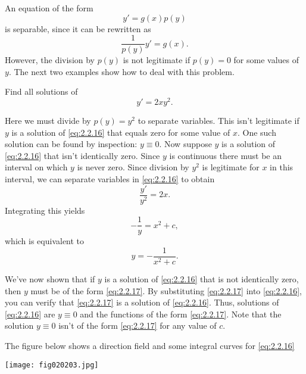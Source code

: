 \documentclass{ximera}
\begin{document}
An equation of the form
$$
y'=g(x)p(y)
$$
 is separable, since it can be rewritten as
$$
\frac{1}{p(y)}y'=g(x).
$$
 However, the division by  $p(y)$
is not legitimate  if $p(y)=0$ for some values of $y$.  The
next two examples show how to deal with this problem.
 
\begin{example}\label{example:2.2.4}
Find all solutions of
\begin{equation} \label{eq:2.2.16}
y'=2xy^2.
\end{equation}
 
\begin{explanation}
Here we must divide by $p(y)=y^2$ to separate variables.
This isn't  legitimate if $y$ is a solution of \eqref{eq:2.2.16} that
equals zero for some value of $x$. One such solution can be found by
inspection:  $y \equiv 0$. Now suppose   $y$ is a solution
of \eqref{eq:2.2.16} that isn't  identically zero. Since $y$ is continuous there must be an interval on which $y$ is never zero. Since division
by $y^2$ is legitimate for $x$ in this interval, we can separate
variables in \eqref{eq:2.2.16} to obtain
$$
\frac{y'}{y^2}=2x.
$$
 Integrating this yields
$$
-\frac{1}{y}=x^2+c,
$$
which is equivalent to
\begin{equation} \label{eq:2.2.17}
y=-\frac{1}{x^2+c}.
\end{equation}
 
We've now shown that if $y$ is a solution of \eqref{eq:2.2.16} that is
not identically zero, then $y$ must be of the form \eqref{eq:2.2.17}. By
substituting \eqref{eq:2.2.17} into \eqref{eq:2.2.16}, you can verify that
\eqref{eq:2.2.17} is  a solution of \eqref{eq:2.2.16}. Thus,
 solutions of \eqref{eq:2.2.16} are $y\equiv 0$ and the functions
of the form \eqref{eq:2.2.17}. Note that the solution $y\equiv 0$ isn't  of
the form \eqref{eq:2.2.17} for any value of $c$.
 
The figure below shows a direction field and some integral
curves for \eqref{eq:2.2.16}
 
 
\begin{image}
  \texttt{[image: fig020203.jpg]}
\end{image}
\end{explanation}
\end{example}
 
\end{document}
